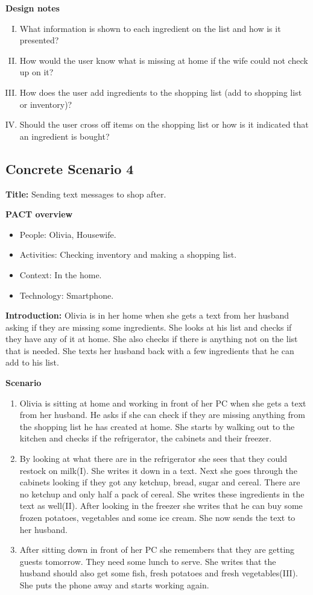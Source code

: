 \textbf{Design notes}

\begin{enumerate} [(I)]
\item What information is shown to each ingredient on the list and how is it presented?
\item How would the user know what is missing at home if the wife could not check up on it?
\item How does the user add ingredients to the shopping list (add to shopping list or inventory)?
\item Should the user cross off items on the shopping list or how is it indicated that an ingredient is bought? 
\end{enumerate}

\subsection{Concrete Scenario 4} \label{ConcreteScenario4}

\textbf{Title:} Sending text messages to shop after.

\textbf{PACT overview}
\begin{itemize}
\item People: Olivia, Housewife.  
\item Activities: Checking inventory and making a shopping list.
\item Context: In the home.
\item Technology: Smartphone.  
\end{itemize}

\textbf{Introduction:} Olivia is in her home when she gets a text from her husband asking if they are missing some ingredients. She looks at his list and checks if they have any of it at home. She also checks if there is anything not on the list that is needed. She texts her husband back with a few ingredients that he can add to his list.

\textbf{Scenario}
\begin{enumerate}
\item Olivia is sitting at home and working in front of her PC when she gets a text from her husband. He asks if she can check if they are missing anything from the shopping list he has created at home. She starts by walking out to the kitchen and checks if the refrigerator, the cabinets and their freezer.
\item By looking at what there are in the refrigerator she sees that they could restock on milk(I). She writes it down in a text. Next she goes through the cabinets looking if they got any ketchup, bread, sugar and cereal. There are no ketchup and only half a pack of cereal. She writes these ingredients in the text as well(II). After looking in the freezer she writes that he can buy some frozen potatoes, vegetables and some ice cream. She now sends the text to her husband.  
\item After sitting down in front of her PC she remembers that they are getting guests tomorrow. They need some lunch to serve. She writes that the husband should also get some fish, fresh potatoes and fresh vegetables(III). She puts the phone away and starts working again. 
\end{enumerate}

